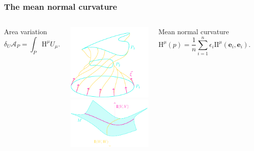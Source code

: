 \documentclass[]{beamer}
\begin{document}
	\begin{frame}
		\frametitle{The mean normal curvature}
		\begin{columns}
			\centering
			\begin{ideablock}{Area variation}
				\[
				\delta_{U}\mathcal{A}_P = \int_{P} \mathrm{H}^{\mu}U_{\mu}.
				\]	
			\end{ideablock}
			\includegraphics[scale=0.66]{Immagini/area-and-curvature/area-and-curvature.pdf}
			\includegraphics[scale=0.8]{Immagini/shape-tensor/shape-tensor.pdf}
			\begin{defblock}{Mean normal curvature}
				\[
				\mathrm{H}^{\mu}(p) = \frac{1}{n} \sum_{i=1}^{n} \epsilon_i \mathrm{I\!I}^{\mu}(\textbf{e}_i, \textbf{e}_i).
				\]
				\end{defblock}
		\end{columns}
	\end{frame}
\end{document}
